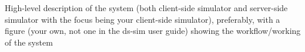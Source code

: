 \begin{itshape}
High-level description of the system (both client-side simulator and server-side simulator with the focus being your client-side simulator), preferably, with a figure (your own, not one in the ds-sim user guide) showing the workflow/working of the system
\end{itshape}